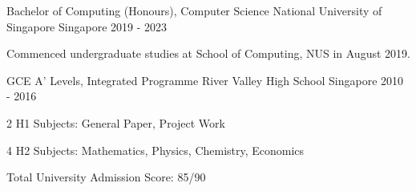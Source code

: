 

\begin{cventries}

  \cventry
    {Bachelor of Computing (Honours), Computer Science} %
    {National University of Singapore} %
    {Singapore} %
    {2019 - 2023} %
    {
      \begin{cvitems} %
        \item {Commenced undergraduate studies at School of Computing, NUS in August 2019.}
      \end{cvitems}
    }
    
  \cventry
    {GCE A' Levels, Integrated Programme} %
    {River Valley High School} %
    {Singapore} %
    {2010 - 2016} %
    {
      \begin{cvitems} %
        \item {2 H1 Subjects: General Paper, Project Work}
        \item {4 H2 Subjects: Mathematics, Physics, Chemistry, Economics}
        \item {Total University Admission Score: 85/90}
      \end{cvitems}
    }

\end{cventries}

